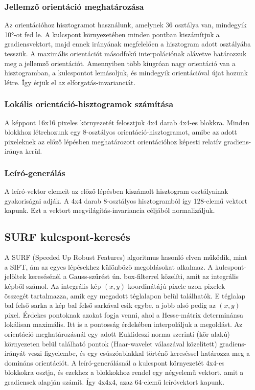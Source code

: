 \documentclass{article}
\begin{document}
	\subsubsection{Jellemző orientáció meghatározása}
	Az orientációhoz hisztogramot használunk, amelynek 36 osztálya van, mindegyik 10°-ot fed le. A kulcspont környezetében minden pontban kiszámítjuk a gradiensvektort, majd ennek irányának megfelelően a hisztogram adott osztályába tesszük. A maximális orientációt másodfokú interpolációnak alávetve határozzuk meg a jellemző orientációt. Amennyiben több kiugróan nagy orientáció van a hisztogramban, a kulcspontot lemásoljuk, és mindegyik orientációval újat hozunk létre. Így érjük el az elforgatás-invarianciát.
	
	\subsubsection{Lokális orientáció-hisztogramok számítása}
	A képpont 16x16 pixeles környezetét felosztjuk 4x4 darab 4x4-es blokkra. Minden blokkhoz létrehozunk egy 8-osztályos orientáció-hisztogramot, amibe az adott pixeleknek az előző lépésben meghatározott orientációhoz képesti relatív gradiens-iránya kerül.
	
	\subsubsection{Leíró-generálás}
	A leíró-vektor elemeit az előző lépésben kiszámolt hisztogram osztályainak gyakoriságai adják. A 4x4 darab 8-osztályos hisztogramból így 128-elemű vektort kapunk. Ezt a vektort megvilágítás-invariancia céljából normalizáljuk.
	
	\subsection{SURF kulcspont-keresés}
	A SURF (Speeded Up Robust Features) algoritmus hasonló elven működik, mint a SIFT, ám az egyes lépésekhez különböző megoldásokat alkalmaz. A kulcspont-jelöltek keresésénél a Gauss-szűrést ún. box-filterrel közelíti, amit az integrális képből számol. Az integrális kép $(x,y)$ koordinátájú pixele azon pixelek összegét tartalmazza, amik egy megadott téglalapon belül találhatók. E téglalap bal felső sarka a kép bal felső sarkával esik egybe, a jobb alsó pedig az $(x,y)$ pixel. Érdekes pontoknak azokat fogja venni, ahol a Hesse-mátrix determinánsa lokálisan maximális. Itt is a pontosság érdekében interpoláljuk a megoldást. Az orientáció meghatározásnál egy adott Euklideszi norma szerinti (kör alakú) környezeten belül található pontok (Haar-wavelet válaszával közelített) gradiens-irányát veszi figyelembe, és egy csúszóablakkal történő kereséssel határozza meg a domináns orientációt. A leíró-generálásnál a kulcspont környezetét 4x4-es blokkokra osztja, és ezekhez a blokkokhoz rendel egy négyelemű vektort, amit a gradiensek alapján számít. Így 4x4x4, azaz 64-elemű leíróvektort kapunk.
	
\end{document}
